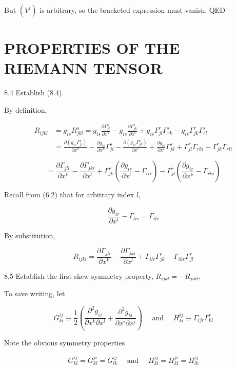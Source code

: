 \documentclass[10pt]{article}
\begin{document}
But $\left(V^{i}\right)$ is arbitrary, so the bracketed expression must vanish. QED

\section*{PROPERTIES OF THE RIEMANN TENSOR}
8.4 Establish (8.4).

By definition,

$$
\begin{aligned}
R_{i j k l} & =g_{i s} R_{j k l}^{s}=g_{i s} \frac{\partial \Gamma_{j l}^{s}}{\partial x^{k}}-g_{i s} \frac{\partial \Gamma_{j k}^{s}}{\partial x^{l}}+g_{i s} \Gamma_{j l}^{r} \Gamma_{r k}^{s}-g_{i s} \Gamma_{j k}^{r} \Gamma_{r l}^{s} \\
& =\frac{\partial\left(g_{i s} \Gamma_{j l}^{s}\right)}{\partial x^{k}}-\frac{\partial g_{i s}}{\partial x^{k}} \Gamma_{j l}^{s}-\frac{\partial\left(g_{i s} \Gamma_{j k}^{s}\right)}{\partial x^{l}}+\frac{\partial g_{i s}}{\partial x^{l}} \Gamma_{j k}^{s}+\Gamma_{j l}^{r} \Gamma_{r k i}-\Gamma_{j k}^{r} \Gamma_{r l i}
\end{aligned}
$$

$$
=\frac{\partial \Gamma_{j l i}}{\partial x^{k}}-\frac{\partial \Gamma_{j k i}}{\partial x^{l}}+\Gamma_{j k}^{r}\left(\frac{\partial g_{i r}}{\partial x^{l}}-\Gamma_{r l i}\right)-\Gamma_{j l}^{r}\left(\frac{\partial g_{i r}}{\partial x^{k}}-\Gamma_{r k i}\right)
$$

Recall from (6.2) that for arbitrary index $l$,

$$
\frac{\partial g_{i r}}{\partial x^{l}}-\Gamma_{l r i}=\Gamma_{i l r}
$$

By substitution,

$$
R_{i j k l}=\frac{\partial \Gamma_{j l i}}{\partial x^{k}}-\frac{\partial \Gamma_{j k i}}{\partial x^{l}}+\Gamma_{i l r} \Gamma_{j k}^{r}-\Gamma_{i k r} \Gamma_{j l}^{r}
$$

8.5 Establish the first skew-symmetry property, $R_{i j k l}=-R_{j i k l}$.

To save writing, let

$$
G_{k l}^{i j} \equiv \frac{1}{2}\left(\frac{\partial^{2} g_{i j}}{\partial x^{k} \partial x^{l}}+\frac{\partial^{2} g_{k l}}{\partial x^{i} \partial x^{j}}\right) \quad \text { and } \quad H_{k l}^{i j} \equiv \Gamma_{i j r} \Gamma_{k l}^{r}
$$

Note the obvious symmetry properties

$$
G_{k l}^{i j}=G_{k l}^{j i}=G_{l k}^{i j} \quad \text { and } \quad H_{k l}^{i j}=H_{k l}^{j i}=H_{l k}^{i j}
$$
\end{document}
